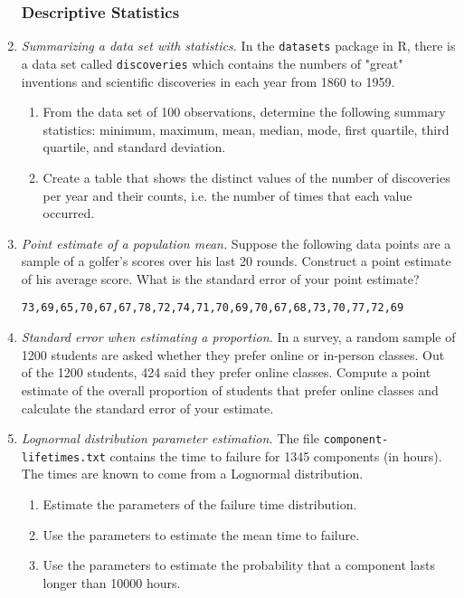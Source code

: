 \begin{enumerate}
\subsubsection*{Descriptive Statistics}

\item \emph{Summarizing a data set with statistics.}  In the
  \texttt{datasets} package in R, there is a data set called
  \texttt{discoveries} which contains the numbers of "great"
  inventions and scientific discoveries in each year from 1860 to
  1959.

\begin{enumerate}
\item From the data set of 100 observations, determine the following
  summary statistics: minimum, maximum, mean, median, mode, first
  quartile, third quartile, and standard deviation.
\item Create a table that shows the distinct values of the number of
  discoveries per year and their counts, i.e. the number of times that
  each value occurred.
\end{enumerate}

\item \emph{Point estimate of a population mean.} Suppose the
  following data points are a sample of a golfer's scores over his
  last 20 rounds. Construct a point estimate of his average
  score. What is the standard error of your point estimate?
\begin{verbatim}
73,69,65,70,67,67,78,72,74,71,70,69,70,67,68,73,70,77,72,69
\end{verbatim}
  
\item \emph{Standard error when estimating a proportion.} In a survey, a
  random sample of \num{1200} students are asked whether they prefer
  online or in-person classes.  Out of the \num{1200} students,
  \num{424} said they prefer online classes. Compute a point estimate
  of the overall proportion of students that prefer online classes and
  calculate the standard error of your estimate.

\item \emph{Lognormal distribution parameter estimation.}  The file
  \texttt{component-lifetimes.txt} contains the time to failure for
  \num{1345} components (in hours). The times are known to come from a
  Lognormal distribution. 
\begin{enumerate}
\item Estimate the parameters of the failure time distribution. 
\item Use the parameters to estimate the mean time to failure. 
\item Use the parameters to estimate the probability that a component lasts
  longer than \num{10000} hours.
\end{enumerate}


\end{enumerate}
